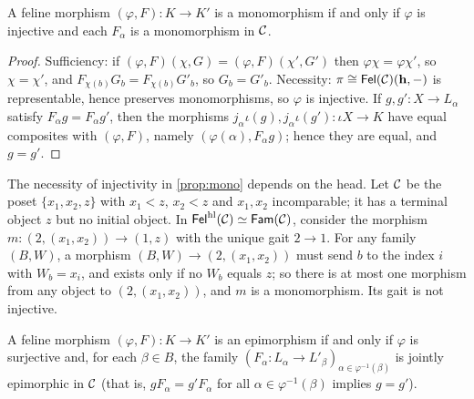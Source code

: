 \begin{proposition}\label{prop:mono}
A feline morphism $(\varphi,F)\colon K\to K'$ is a monomorphism if and only if
$\varphi$ is injective and each $F_\alpha$ is a monomorphism in $\mathcal{C}$.
\end{proposition}

\begin{proof}
Sufficiency: if $(\varphi,F)(\chi,G)=(\varphi,F)(\chi',G')$ then
$\varphi\chi=\varphi\chi'$, so $\chi=\chi'$, and $F_{\chi(b)}G_b=F_{\chi(b)}G'_b$,
so $G_b=G'_b$. Necessity: $\pi\cong\mathsf{Fel}(\mathcal{C})(\mathbf{h},-)$ is representable,
hence preserves monomorphisms, so $\varphi$ is injective. If
$g,g'\colon X\to L_\alpha$ satisfy $F_\alpha g=F_\alpha g'$, then the morphisms
$j_\alpha\iota(g),j_\alpha\iota(g')\colon\iota X\to K$ have equal composites with
$(\varphi,F)$, namely $(\varphi(\alpha),F_\alpha g)$; hence they are equal, and
$g=g'$.
\end{proof}

\begin{counterexample}\label{cex:mono-headless}
The necessity of injectivity in \cref{prop:mono} depends on the head. Let
$\mathcal{C}$ be the poset $\{x_1,x_2,z\}$ with $x_1<z$, $x_2<z$ and $x_1,x_2$
incomparable; it has a terminal object $z$ but no initial object. In
$\mathsf{Fel}^{\mathrm{hl}}(\mathcal{C})\simeq\mathsf{Fam}(\mathcal{C})$, consider the morphism
$m\colon(2,(x_1,x_2))\to(1,z)$ with the unique gait $2\to1$. For any family
$(B,W)$, a morphism $(B,W)\to(2,(x_1,x_2))$ must send $b$ to the index $i$ with
$W_b=x_i$, and exists only if no $W_b$ equals $z$; so there is at most one
morphism from any object to $(2,(x_1,x_2))$, and $m$ is a monomorphism. Its
gait is not injective.
\end{counterexample}

\begin{proposition}\label{prop:epi}
A feline morphism $(\varphi,F)\colon K\to K'$ is an epimorphism if and only if
$\varphi$ is surjective and, for each $\beta\in B$, the family
$(F_\alpha\colon L_\alpha\to L'_\beta)_{\alpha\in\varphi^{-1}(\beta)}$ is jointly
epimorphic in $\mathcal{C}$ (that is, $gF_\alpha=g'F_\alpha$ for all
$\alpha\in\varphi^{-1}(\beta)$ implies $g=g'$).
\end{proposition}

